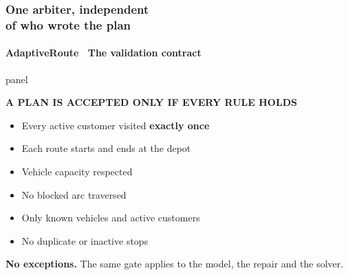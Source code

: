 \documentclass[aspectratio=169,10pt]{beamer}
\newcommand{\cy}[1]{{\color{arCyan2}\bfseries #1}}
\newcommand{\gn}[1]{{\color{arGreen}\bfseries #1}}
\newcommand{\plabel}[1]{{\color{arCyan2}\fontsize{6.4}{7.6}\selectfont\bfseries\MakeUppercase{#1}}}
\newenvironment{panel}[1]{%
  \begin{beamercolorbox}[wd=#1,rounded=true,shadow=false,sep=7pt]{panel}%
}{%
  \end{beamercolorbox}%
}
\begin{document}
\begin{frame}
  \frametitle{One arbiter, independent\\ of who wrote the plan}
  \framesubtitle{AdaptiveRoute \textperiodcentered\ The validation contract}

  \vspace{0.5em}
  \begin{panel}{\linewidth}
    \plabel{A plan is accepted only if every rule holds}\\[0.7em]
    \begin{minipage}[t]{0.47\linewidth}
      \begin{itemize}\setlength\itemsep{0.3em}
        \item[\color{arCyan}$\bullet$] Every active customer visited \cy{exactly once}
        \item[\color{arCyan}$\bullet$] Each route starts and ends at the depot
        \item[\color{arCyan}$\bullet$] Vehicle capacity respected
      \end{itemize}
    \end{minipage}\hfill
    \begin{minipage}[t]{0.47\linewidth}
      \begin{itemize}\setlength\itemsep{0.3em}
        \item[\color{arCyan}$\bullet$] No blocked arc traversed
        \item[\color{arCyan}$\bullet$] Only known vehicles and active customers
        \item[\color{arCyan}$\bullet$] No duplicate or inactive stops
      \end{itemize}
    \end{minipage}
  \end{panel}

  \vspace{1.0em}
  \centering
  \gn{No exceptions.} The same gate applies to the model, the repair and the solver.

\end{frame}
\end{document}
